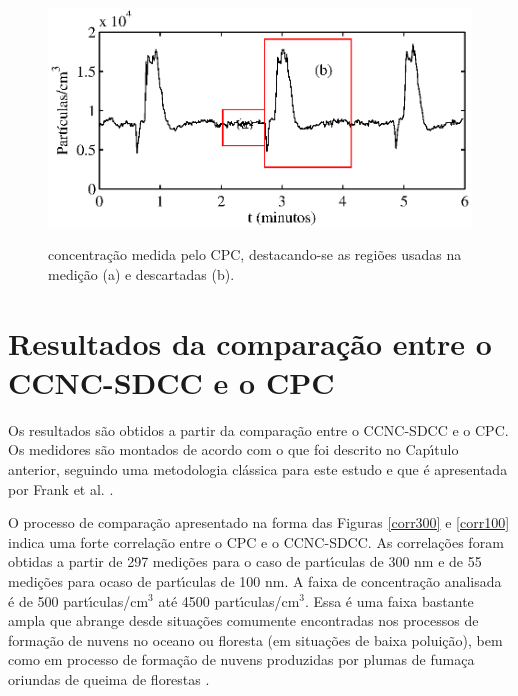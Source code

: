 \begin{figure}[hbt]
\begin{center}
\includegraphics[scale=1.0]{GraficosMatlab/transiente.eps}\\
\end{center}
\caption{\label{transiente}\hspace{-0.1em} concentra\c{c}\~{a}o medida pelo CPC, destacando-se as regi\~{o}es usadas na medi\c{c}\~{a}o (a) e descartadas (b). }
\end{figure}


\section{Resultados da compara\c{c}\~{a}o entre o CCNC-SDCC e o CPC}
Os resultados s\~{a}o obtidos a partir da compara\c{c}\~{a}o entre o CCNC-SDCC e o CPC. Os medidores s\~{a}o montados de acordo com o que foi descrito no Cap\'{\i}tulo anterior, seguindo uma metodologia cl\'{a}ssica para este estudo  e que \'{e} apresentada por Frank et al. \cite{Frank}.

O processo de compara\c{c}\~{a}o apresentado na forma das Figuras  \ref{corr300} e \ref{corr100} indica uma forte correla\c{c}\~{a}o entre o CPC e o CCNC-SDCC. As correla\c{c}\~{o}es foram obtidas a partir de 297 medi\c{c}\~{o}es para o caso de part\'{\i}culas de 300 nm e de 55 medi\c{c}\~{o}es para ocaso de part\'{\i}culas de 100 nm.  A faixa de concentra\c{c}\~{a}o analisada \'{e} de 500 part\'{\i}culas/cm$^3$ at\'{e} 4500 part\'{\i}culas/cm$^3$. Essa \'{e} uma faixa bastante ampla que abrange desde situa\c{c}\~{o}es comumente encontradas nos processos de forma\c{c}\~{a}o de nuvens no oceano ou floresta (em situa\c{c}\~{o}es de baixa polui\c{c}\~{a}o), bem como em processo de forma\c{c}\~{a}o de nuvens produzidas por plumas de fuma\c{c}a oriundas de queima de florestas \cite{Andreae}.

